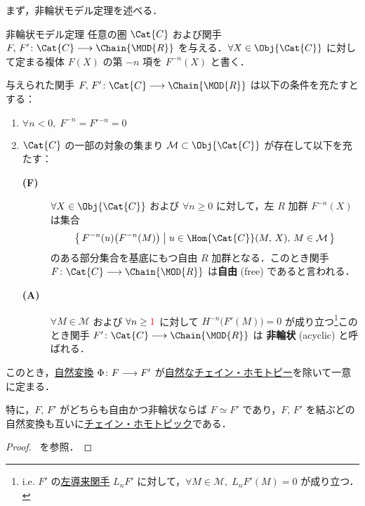\documentclass[algtopo_main]{subfiles}
\begin{document}
まず，非輪状モデル定理を述べる．
\begin{mytheo}[label=thm:AM, breakable]{非輪状モデル定理}
    任意の圏 $\Cat{C}$ および関手 $F,\, F' \colon \Cat{C} \lto \Chain{\MOD{R}}$ を与える．$\forall X \in \Obj{\Cat{C}}$ に対して定まる複体 $F(X)$ の第 $-n$ 項を $F^{-n}(X)$ と書く．
    
    与えられた関手 $F,\, F' \colon \Cat{C} \lto \Chain{\MOD{R}}$ は以下の条件を充たすとする：
    \begin{enumerate}
        \item $\forall n < 0,\; F^{-n} = F'{}^{-n} = 0$
        \item $\Cat{C}$ の一部の対象の集まり $\mathcal{M} \subset \Obj{\Cat{C}}$ が存在して以下を充たす：
        \begin{description}
            \item[\textbf{(F)}] $\forall X \in \Obj{\Cat{C}}$ および $\forall n \ge 0$ に対して，左 $R$ 加群 $F^{-n}(X)$ は集合
            \begin{align}
                \bigl\{\, F^{-n}(u) \bigl( F^{-n}(M) \bigr) \bigm| u \in \Hom{\Cat{C}}(M,\, X),\, M \in \mathcal{M} \,\bigr\} 
            \end{align}
            のある部分集合を基底にもつ自由 $R$ 加群となる．このとき関手 $F \colon \Cat{C} \lto \Chain{\MOD{R}}$ は\textbf{自由} (free) であると言われる．
            \item[\textbf{(A)}] $\forall M \in \mathcal{M}$ および $\forall n \ge \textcolor{red}{1}$ に対して $H^{-n}\bigl(F'(M)\bigr) = 0$ が成り立つ\footnote{i.e. $F'$ の\hyperref[def:LD]{左導来関手} $L_nF'$ に対して，$\forall M \in \mathcal{M},\; L_nF'(M) = 0$ が成り立つ．}このとき関手 $F'\colon \Cat{C} \lto \Chain{\MOD{R}}$ は \textbf{非輪状} (acyclic) と呼ばれる． 
        \end{description}
    \end{enumerate}
    このとき，\hyperref[def:nat]{自然変換} $\Phi \colon F \longrightarrow F'$ が\underline{自然な}\hyperref[def:chain-homotopy]{チェイン・ホモトピー}を除いて一意に定まる．

    特に，$F,\, F'$ がどちらも自由かつ非輪状ならば $F \simeq F'$ であり，$F,\, F'$ を結ぶどの自然変換も互いに\hyperref[def:chain-homotopy]{チェイン・ホモトピック}である．
\end{mytheo}

\begin{proof}
    ~\cite[p.165 thorem 8]{Spanier}を参照．
\end{proof}
\end{document}
